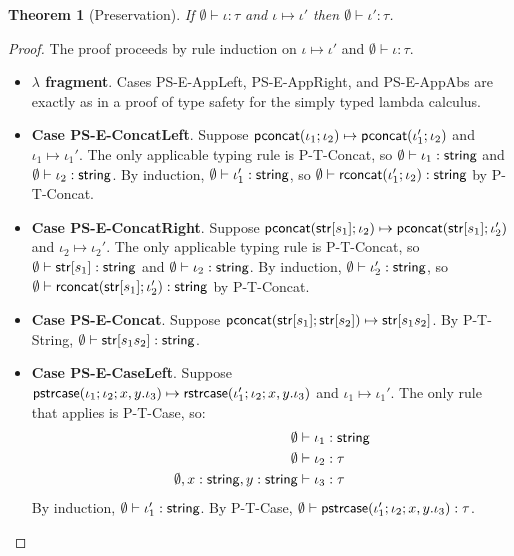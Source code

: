 \documentclass[11pt,leqno]{article}
\newtheorem{thm}{Theorem}
\theoremstyle{definition}
\renewcommand{\tstr}[1]{{{\sf str}[#1]}}
\newcommand{\tconcat}[2]{{\sf pconcat}(#1;#2)} %
\newcommand{\str}{{\sf string}}
\newcommand{\strcase}[3]{ {\sf rstrcase}(#1; #2; #3)}
\newcommand{\pstrcase}[3]{ {\sf pstrcase}(#1; #2; #3)}
\begin{document}
\begin{thm}[Preservation]
If $\emptyset \vdash \iota : \tau$ and $\iota \mapsto \iota'$ then $\emptyset \vdash \iota' : \tau$.
\end{thm}
\begin{proof}

The proof proceeds by rule induction on $\iota \mapsto \iota'$ and $\emptyset \vdash \iota : \tau$.

\begin{itemize}[label=$ $,itemsep=1ex]
\item \textbf{$\lambda$ fragment}. Cases PS-E-AppLeft, PS-E-AppRight, and PS-E-AppAbs are exactly as in a proof of type safety for
the simply typed lambda calculus.

\item \textbf{Case PS-E-ConcatLeft}.
Suppose $\tconcat{\iota_1}{\iota_2} \mapsto \tconcat{\iota_1'}{\iota_2}$ and $\iota_1 \mapsto \iota_1'$. The only applicable typing rule is P-T-Concat, so $\emptyset \vdash \iota_1 : \str$
and $\emptyset \vdash \iota_2 : \str$. 
By induction, $\emptyset \vdash \iota_1' : \str$,
so $\emptyset \vdash \rconcat{\iota_1'}{\iota_2} : \str$ by P-T-Concat.

\item \textbf{Case PS-E-ConcatRight}. Suppose $\tconcat{\tstr{s_1}}{\iota_2} \mapsto \tconcat{\tstr{s_1}}{\iota_2'}$ and $\iota_2 \mapsto \iota_2'$. The only applicable typing rule is P-T-Concat, so $\emptyset \vdash \tstr{s_1} : \str$
and $\emptyset \vdash \iota_2 : \str$. 
By induction, $\emptyset \vdash \iota_2' : \str$,
so $\emptyset \vdash \rconcat{\tstr{s_1}}{\iota_2'} : \str$ by P-T-Concat.

\item \textbf{Case PS-E-Concat}. Suppose $\tconcat{\tstr{s_1}}{\tstr{s_2}} \mapsto \tstr{s_1s_2}$. By P-T-String, $\emptyset \vdash \tstr{s_1s_2} : \str$.

\item \textbf{Case PS-E-CaseLeft}. Suppose $\pstrcase{\iota_1}{\iota_2}{x,y.\iota_3} \mapsto \strcase{\iota_1'}{\iota_2}{x,y.\iota_3}$ and $\iota_1 \mapsto \iota_1'$.
The only rule that applies is P-T-Case, so:
\begin{align*}
  \emptyset &\vdash \iota_1 : \str  \\
  \emptyset &\vdash \iota_2 : \tau \\
  \emptyset, x : \str, y : \str &\vdash \iota_3 : \tau 
\end{align*}
By induction, $\emptyset \vdash \iota_1' : \str$.
By P-T-Case, $\emptyset \vdash \pstrcase{\iota_1'}{\iota_2}{x,y.\iota_3} : \tau$.


\end{itemize}
\end{proof}
\end{document}
